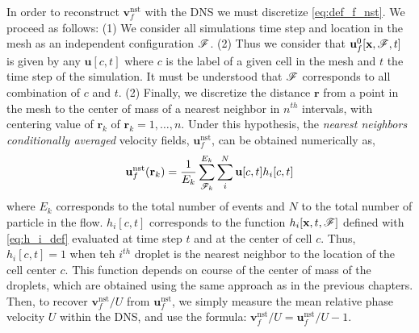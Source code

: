 In order to reconstruct $\textbf{v}_f^\text{nst}$ with the DNS we must discretize \ref{eq:def_f_nst}. 
We proceed as follows: 
(1) We consider all simulations time step and location in the mesh as an independent configuration $\mathscr{F}$. 
(2) Thus we consider that $\textbf{u}_f^0[\textbf{x},\mathscr{F},t]$ is given by any $\textbf{u}[c,t]$ where $c$ is the label of a given cell in the mesh and $t$ the time step of the simulation. 
It must be understood that $\mathscr{F}$ corresponds to all combination of $c$ and $t$. 
(2) Finally, we discretize the distance $\textbf{r}$ from a point in the mesh to the center of mass of a nearest neighbor in $n^{th}$ intervals, with centering value of $\textbf{r}_k$ of $\textbf{r}_k = 1,\ldots,n$. 
Under this hypothesis, the \textit{nearest neighbors conditionally averaged} velocity fields, $\textbf{u}_f^\text{nst}$, can be obtained numerically as, 
\begin{equation}
    \textbf{u}_f^\text{nst}(\textbf{r}_k)
    = 
    \frac{1}{E_k}
    \sum_{\FF_k}^{E_k}
    \sum_i^N
    \textbf{u}[c,t] h_i[c,t]
    \label{eq:vnst_DNS}
\end{equation}
where $E_k$ corresponds to the total number of events and $N$ to the total number of particle in the flow.
$h_i[c,t]$ corresponds to the function $h_i[\textbf{x},t,\mathscr{F}]$ defined with \ref{eq:h_i_def} evaluated at time step $t$ and at the center of cell $c$. 
Thus, $h_i[c,t] = 1$ when teh $i^{th}$ droplet is the nearest neighbor to the location of the cell center $c$. 
This function depends on course of the center of mass of the droplets, which are obtained using the same approach as in the previous chapters.
Then, to recover $\textbf{v}_f^\text{nst}/U$ from $\textbf{u}_f^\text{nst}$, we simply measure the mean relative phase velocity $U$ within the DNS, and use the formula: $\textbf{v}_f^\text{nst} /  U = \textbf{u}_f^\text{nst} / U -1 $. 



